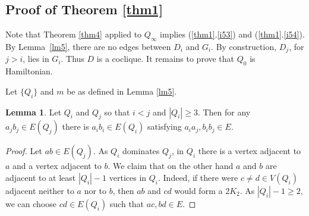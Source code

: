 \documentclass{amsart}
\theoremstyle{definition}
\newtheorem{lemma}{Lemma}
\begin{document}
\subsection{Proof of Theorem \ref{thm1}}
Note that Theorem \ref{thm4} applied to $Q_\infty$ implies (\ref{thm1}.\ref{i53}) and  (\ref{thm1}.\ref{i54}).
By Lemma~\ref{lm5}, there are no edges between $D_i$ and $G_i$. By construction, 
$D_j$, for $j>i$, lies in $G_i$. Thus $D$ is a coclique.
It remains to prove that $Q_0$ is Hamiltonian.

Let $\{Q_i\}$ and $m$ be as defined in Lemma \ref{lm5}.
\begin{lemma}\label{lem:twoQ}
Let $Q_i$ and $Q_j$ so that $i<j$ and $|Q_i|\geq 3$.
Then for any $a_j b_j\in E(Q_j)$  there is $a_i b_i\in E(Q_i)$ satisfying
$a_i a_j, b_i b_j\in E$.
\end{lemma}
\begin{proof}
Let $ab\in E(Q_j)$. As $Q_i$ dominates $Q_j$, in $Q_i$ there is a vertex adjacent to 
$a$ and a vertex adjacent to $b$.
We claim that on the other hand $a$ and $b$ are adjacent to at least $|Q_i|-1$ vertices in $Q_i$. 
Indeed, if there were $c\neq d\in V(Q_i)$ adjacent neither to $a$ nor to $b$, 
then $ab$ and $cd$ would form a $2K_2$.
As $|Q_i|-1\ge 2$, we can choose $cd\in E(Q_i)$ such that $ac, bd\in E$.
\end{proof}
 
\end{document}
